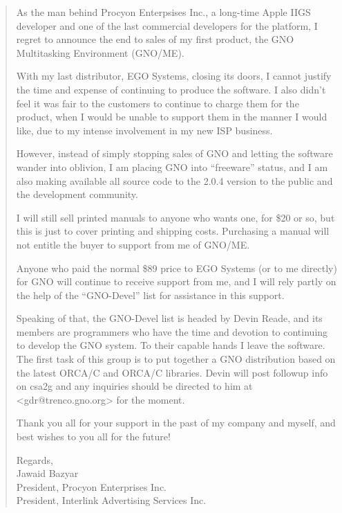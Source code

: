 \documentclass{report}
\begin{document}
\begin{quote}

As the man behind Procyon Enterpsises Inc., a long-time Apple IIGS
developer and one of the last commercial developers for the platform,
I regret to announce the end to sales of my first product, the GNO
Multitasking Environment (GNO/ME).

With my last distributor, EGO Systems, closing its doors, I cannot
justify the time and expense of continuing to produce the software. I
also didn't feel it was fair to the customers to continue to charge them
for the product, when I would be unable to support them in the manner
I would like, due to my intense involvement in my new ISP business.

However, instead of simply stopping sales of GNO and letting the software
wander into oblivion, I am placing GNO into ``freeware'' status, and I am
also making available all source code to the 2.0.4 version to the public
and the development community.

I will still sell printed manuals to anyone who wants one, for \$20 or
so, but this is just to cover printing and shipping costs. Purchasing
a manual will not entitle the buyer to support from me of GNO/ME.

Anyone who paid the normal \$89 price to EGO Systems (or to me directly)
for GNO will continue to receive support from me, and I will rely partly
on the help of the ``GNO-Devel'' list for assistance in this support.

Speaking of that, the GNO-Devel list is headed by Devin Reade,
and its members are programmers who have the time and devotion to
continuing to develop the GNO system. To their capable hands I leave
the software. The first task of this group is to put together a GNO
distribution based on the latest ORCA/C and ORCA/C libraries. Devin will
post followup info on csa2g and any inquiries should be directed to him
at <gdr@trenco.gno.org> for the moment.

Thank you all for your support in the past of my company and myself,
and best wishes to you all for the future!

\begin{flushleft}
Regards, \\

Jawaid Bazyar \\
President, Procyon Enterprises Inc. \\
President, Interlink Advertising Services Inc. \\
\end{flushleft}

\end{quote}
\end{document}
